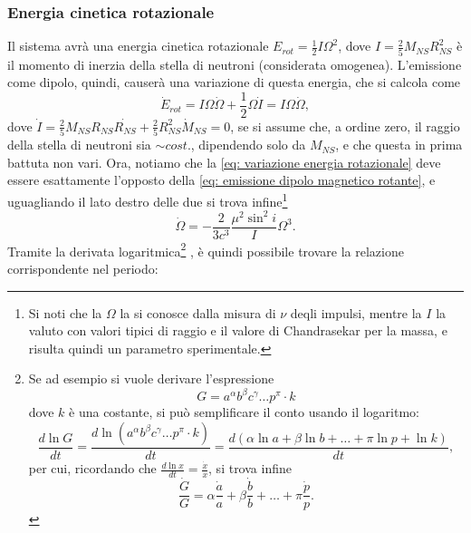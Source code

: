 \subsubsection{Energia cinetica rotazionale}
Il sistema avrà una energia cinetica rotazionale $E_{rot}=\frac{1}{2}I\Omega^2 $, dove $I=\frac{2}{5}M_{NS}R_{NS}^2 $ è il momento di inerzia della stella di neutroni (considerata omogenea).
L'emissione come dipolo, quindi, causerà una variazione di questa energia, che si calcola come
\begin{equation}
    \dot{E}_{rot}=I\Omega\dot{\Omega}+\frac{1}{2}\Omega\dot{I}=I\Omega\dot{\Omega},
    \label{eq: variazione energia rotazionale}
\end{equation}
dove $\dot{I}=\frac{2}{5}M_{NS}R_{NS}\dot{R_{NS}}+\frac{2}{5}R_{NS}^2\dot{M}_{NS } = 0$, se si assume che, a ordine zero, il raggio della stella di neutroni sia $\sim cost.$, dipendendo solo da $M_{NS}$, e che questa in prima battuta non vari.
Ora, notiamo che la \eqref{eq: variazione energia rotazionale} deve essere esattamente l'opposto della \eqref{eq: emissione dipolo magnetico rotante}, e uguagliando il lato destro delle due si trova infine\footnote{Si noti che la $\Omega$ la si conosce dalla misura di $\nu$ deqli impulsi, mentre la $I$ la valuto con valori tipici di raggio e il valore di Chandrasekar per la massa, e risulta quindi un parametro sperimentale.}
\begin{equation}
    \dot{\Omega}=-\frac{2}{3c^3}\frac{\mu^2\sin^2{i}}{I}\Omega^3.
    \label{eq: variazione vel. ang. per emissione di dipolo rotante}
\end{equation}
Tramite la derivata logaritmica\footnote{Se ad esempio si vuole derivare l'espressione
\begin{equation}
    G=a^\alpha b^\beta c^\gamma \dots p^\pi \cdot k
\end{equation}
dove $k$ è una costante, si può semplificare il conto usando il logaritmo:
\begin{equation}
    \frac{d\ln{G}}{dt} = \frac{d\ln{(a^\alpha b^\beta c^\gamma \dots p^\pi \cdot k)}}{dt}=\frac{d(\alpha\ln{a} + \beta\ln{b + \dots + \pi\ln{p} + \ln{k}})}{dt},
\end{equation}
per cui, ricordando che $\frac{d\ln{x}}{dt}= \frac{\dot{x}}{x}$, si trova infine
\begin{equation}
    \frac{\dot{G}}{G} = \alpha\frac{\dot{a}}{a} + \beta\frac{\dot{b}}{b}+\dots+\pi\frac{\dot{p}}{p}.
\end{equation}
}
, è quindi possibile trovare la relazione corrispondente nel periodo:
